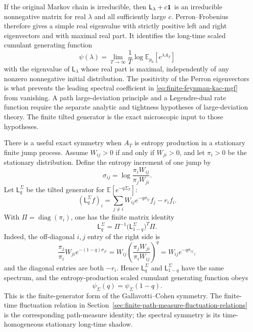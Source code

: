 If the original Markov chain is irreducible, then
\(\mathsf L_\lambda+c{\bf 1}\) is an irreducible nonnegative matrix for
real \(\lambda\) and all sufficiently large \(c\).  Perron--Frobenius
therefore gives a simple real eigenvalue with strictly positive left and
right eigenvectors and with maximal real part.  It identifies the long-time
scaled cumulant generating function
\[
  \psi(\lambda)
  =
  \lim_{T\to\infty}
  \frac1T\log
  \mathbb E_{p_0}\!\left[e^{\lambda A_T}\right]
\]
with the eigenvalue of \(\mathsf L_\lambda\) whose real part is maximal,
independently of any nonzero nonnegative initial distribution.  The
positivity of the Perron eigenvectors is what prevents the leading spectral
coefficient in \eqref{eq:finite-feynman-kac-mgf} from vanishing.  A path
large-deviation principle and a Legendre-dual rate function require the
separate analytic and tightness hypotheses of large-deviation theory.  The
finite tilted generator is the exact microscopic input to those hypotheses.

There is a useful exact symmetry when \(A_T\) is entropy production in a
stationary finite jump process.  Assume \(W_{ij}>0\) if and only if
\(W_{ji}>0\), and let \(\pi_i>0\) be the stationary distribution.  Define
the entropy increment of one jump by
\begin{equation}
  \sigma_{ij}
  =
  \log\frac{\pi_iW_{ij}}{\pi_jW_{ji}} .
  \label{eq:stationary-entropy-jump-increment}
\end{equation}
Let \(\mathsf L_q^\Sigma\) be the tilted generator for
\(\mathbb E[e^{-q\Sigma_T}]\):
\begin{equation}
  (\mathsf L_q^\Sigma f)_i
  =
  \sum_{j\ne i}
  W_{ij}e^{-q\sigma_{ij}}f_j-r_if_i .
  \label{eq:entropy-production-tilted-generator}
\end{equation}
With \(\Pi=\operatorname{diag}(\pi_i)\), one has the finite matrix identity
\begin{equation}
  \mathsf L_q^\Sigma
  =
  \Pi^{-1}
  \bigl(\mathsf L_{1-q}^\Sigma\bigr)^T
  \Pi .
  \label{eq:finite-gallavotti-cohen-similarity}
\end{equation}
Indeed, the off-diagonal \(i,j\) entry of the right side is
\[
  \frac{\pi_j}{\pi_i}
  W_{ji}e^{-(1-q)\sigma_{ji}}
  =
  W_{ij}
  \left(\frac{\pi_jW_{ji}}{\pi_iW_{ij}}\right)^q
  =
  W_{ij}e^{-q\sigma_{ij}},
\]
and the diagonal entries are both \(-r_i\).  Hence
\(\mathsf L_q^\Sigma\) and \(\mathsf L_{1-q}^\Sigma\) have the same
spectrum, and the entropy-production scaled cumulant generating function
obeys
\[
  \psi_\Sigma(q)=\psi_\Sigma(1-q).
\]
This is the finite-generator form of the Gallavotti--Cohen symmetry.  The
finite-time fluctuation relation in
Section~\ref{sec:finite-path-measure-fluctuation-relations} is the
corresponding path-measure identity; the spectral symmetry is its
time-homogeneous stationary long-time shadow.

